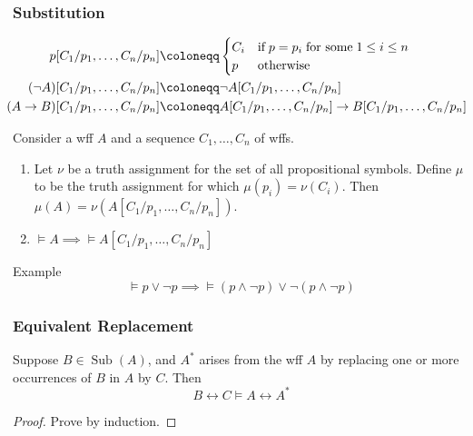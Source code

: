 \documentclass[UTF8,11pt,colorlinks,compress,openany]{beamer}%
\begin{document}
\begin{frame}\frametitle{Substitution}\vspace*{-3ex}
	\begin{align*}
	p[C_1/p_1,\dots,C_n/p_n]&\coloneqq 
	\begin{cases}
	 C_i &\mbox{if}\;p=p_i\;\mbox{for some}\;1\leq i\leq n\\
	p &\mbox{otherwise}
	\end{cases}\\
	(\neg A)[C_1/p_1,\dots,C_n/p_n]&\coloneqq \neg A[C_1/p_1,\dots,C_n/p_n]\\
	\hspace*{-7pt}(A\to B)[C_1/p_1,\dots,C_n/p_n]&\coloneqq A[C_1/p_1,\dots,C_n/p_n]\to B[C_1/p_1,\dots,C_n/p_n]
	\end{align*}
	\begin{theorem}
		Consider a wff $A$ and a sequence $C_1,\dots,C_n$ of wffs.
		\begin{enumerate}
			\item Let $\nu$ be a truth assignment for the set of all propositional symbols. Define $\mu$ to be the truth assignment for which $\mu(p_i)=\nu(C_i)$. Then $\mu(A)=\nu\left(A[C_1/p_1,\dots,C_n/p_n]\right)$.
			\item $\vDash A\implies\vDash A[C_1/p_1,\dots,C_n/p_n]$
		\end{enumerate}
	\end{theorem}
	\begin{block}{Example}
		\[\vDash p\vee\neg p\implies\vDash(p\wedge\neg p)\vee\neg(p\wedge\neg p)\]
	\end{block}
\end{frame}

\begin{frame}\frametitle{Equivalent Replacement}
	\begin{theorem}
		Suppose $B\in \operatorname{Sub}(A)$, and $A^*$ arises from the wff $A$ by replacing one or more occurrences of $B$ in $A$ by $C$. Then
		\[B\leftrightarrow C\vDash A\leftrightarrow A^*\]
	\end{theorem}
	\begin{proof}
		Prove by induction.
	\end{proof}
\end{frame}
\end{document}
